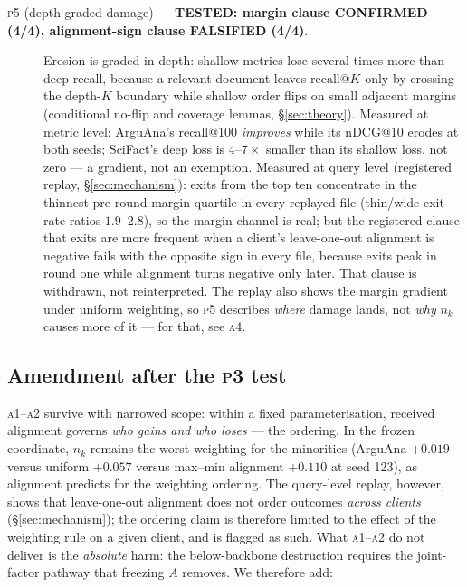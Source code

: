 \begin{description}
\item[\textsc{p5} (depth-graded damage) --- \textbf{TESTED: margin clause
CONFIRMED (4/4), alignment-sign clause FALSIFIED (4/4)}.] Erosion is graded in
depth: shallow metrics lose several times more than deep recall, because a
relevant document leaves $\mathrm{recall}@K$ only by crossing the depth-$K$
boundary while shallow order flips on small adjacent margins (conditional
no-flip and coverage lemmas, \S\ref{sec:theory}). Measured at metric level:
ArguAna's recall@100 \emph{improves} while its nDCG@10 erodes at both seeds;
SciFact's deep loss is $4$--$7\times$ smaller than its shallow loss, not zero
--- a gradient, not an exemption. Measured at query level (registered replay,
\S\ref{sec:mechanism}): exits from the top ten concentrate in the thinnest
pre-round margin quartile in every replayed file (thin/wide exit-rate ratios
$1.9$--$2.8$), so the margin channel is real; but the registered clause that
exits are more frequent when a client's leave-one-out alignment is negative
fails with the opposite sign in every file, because exits peak in round one
while alignment turns negative only later. That clause is withdrawn, not
reinterpreted. The replay also shows the margin gradient under uniform
weighting, so \textsc{p5} describes \emph{where} damage lands, not \emph{why}
$n_k$ causes more of it --- for that, see \textsc{a4}.
\end{description}

\subsection{Amendment after the \textsc{p3} test}\label{sec:model-amend}

\textsc{a1}--\textsc{a2} survive with narrowed scope: within a fixed
parameterisation, received alignment governs \emph{who gains and who loses} ---
the ordering. In the frozen coordinate, $n_k$ remains the worst weighting for
the minorities (ArguAna $+0.019$ versus uniform $+0.057$ versus max--min
alignment $+0.110$ at seed 123), as alignment predicts for the weighting
ordering. The query-level replay, however, shows that leave-one-out alignment
does not order outcomes \emph{across clients} (\S\ref{sec:mechanism}); the
ordering claim is therefore limited to the effect of the weighting rule on a
given client, and is flagged as such. What
\textsc{a1}--\textsc{a2} do not deliver is the \emph{absolute} harm: the
below-backbone destruction requires the joint-factor pathway that freezing $A$
removes. We therefore add:

